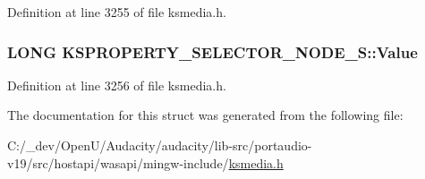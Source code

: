 Definition at line 3255 of file ksmedia.\+h.

\subsubsection[{\texorpdfstring{Value}{Value}}]{\setlength{\rightskip}{0pt plus 5cm}L\+O\+NG K\+S\+P\+R\+O\+P\+E\+R\+T\+Y\+\_\+\+S\+E\+L\+E\+C\+T\+O\+R\+\_\+\+N\+O\+D\+E\+\_\+\+S\+::\+Value}\hypertarget{struct_k_s_p_r_o_p_e_r_t_y___s_e_l_e_c_t_o_r___n_o_d_e___s_ac1c76738a218e1b2be36fa55fe676827}{}\label{struct_k_s_p_r_o_p_e_r_t_y___s_e_l_e_c_t_o_r___n_o_d_e___s_ac1c76738a218e1b2be36fa55fe676827}


Definition at line 3256 of file ksmedia.\+h.



The documentation for this struct was generated from the following file\+:\begin{DoxyCompactItemize}
\item 
C\+:/\+\_\+dev/\+Open\+U/\+Audacity/audacity/lib-\/src/portaudio-\/v19/src/hostapi/wasapi/mingw-\/include/\hyperlink{ksmedia_8h}{ksmedia.\+h}\end{DoxyCompactItemize}
